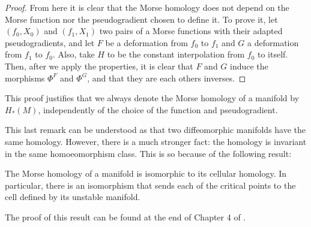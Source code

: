 \begin{proof}
From here it is clear that the Morse homology does not depend on the Morse function nor the pseudogradient chosen to define it. To prove it, let $(f_0,X_0)$ and $(f_1,X_1)$ two pairs of a Morse functions with their adapted pseudogradients, and let $F$ be a deformation from $f_0$ to $f_1$ and $G$ a deformation from $f_1$ to $f_0$. Also, take $H$ to be the constant interpolation from $f_0$ to itself. Then, after we apply the properties, it is clear that $F$ and $G$ induce the morphisms $\Phi^F$ and $\Phi^G$, and that they are each others inverses.
\end{proof}

\begin{rmrk}
This proof justifies that we always denote the Morse homology of a manifold by $H_{\ast}(M)$, independently of the choice of the function and pseudogradient.
\end{rmrk}

This last remark can be understood as that two diffeomorphic manifolds have the same homology. However, there is a much stronger fact: the homology is invariant in the same homoeomorphism class. This is so because of the following result:

\begin{theo} The Morse homology of a manifold is isomorphic to its cellular homology. In particular, there is an isomorphism that sends each of the critical points to the cell defined by its unstable manifold.
\end{theo}

The proof of this result can be found at the end of Chapter 4 of \cite{audin2014morse}.
